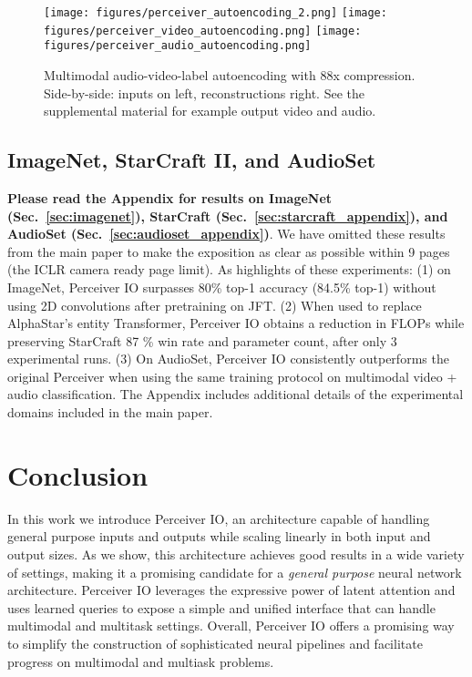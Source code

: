 \documentclass{article} \usepackage{iclr2022_conference,times}
\newcommand{\ourmodel}{Perceiver IO\xspace}
\begin{document}
\begin{figure*}[t]
    \centering
    \texttt{[image: figures/perceiver\_autoencoding\_2.png]}
    \texttt{[image: figures/perceiver\_video\_autoencoding.png]}
    \texttt{[image: figures/perceiver\_audio\_autoencoding.png]}
    \caption{Multimodal audio-video-label autoencoding with 88x compression. Side-by-side: inputs on left, reconstructions right. See the supplemental material for example output video and audio.}
    \label{fig:autoencoding_viz}
    \vspace{-8pt}
\end{figure*}

\subsection{ImageNet, StarCraft II, and AudioSet}
\textbf{Please read the Appendix for results on ImageNet (Sec.~\ref{sec:imagenet}), StarCraft  (Sec.~\ref{sec:starcraft_appendix}), and AudioSet (Sec.~\ref{sec:audioset_appendix})}. We have omitted these results from the main paper to make the exposition as clear as possible within 9 pages (the ICLR camera ready page limit). As highlights of these experiments: (1) on ImageNet, \ourmodel surpasses 80\% top-1 accuracy (84.5\% top-1) without using 2D convolutions after pretraining on JFT. (2) When used to replace AlphaStar's entity Transformer, \ourmodel obtains a  reduction in FLOPs while preserving StarCraft  87 \% win rate and parameter count, after only 3 experimental runs. (3) On AudioSet, \ourmodel consistently outperforms the original Perceiver when using the same training protocol on multimodal video + audio classification. The Appendix includes additional details of the experimental domains included in the main paper.

\section{Conclusion}

In this work we introduce \ourmodel{}, an architecture capable of handling general purpose inputs and outputs while scaling linearly in both input and output sizes. As we show, this architecture achieves good results in a wide variety of settings, making it a promising candidate for a \textit{general purpose} neural network architecture.  \ourmodel{} leverages the expressive power of latent attention and uses learned queries to expose a simple and unified interface that can handle multimodal and multitask settings. Overall, \ourmodel{} offers a promising way to simplify the construction of sophisticated neural pipelines and facilitate progress on multimodal and multiask problems.
\end{document}
